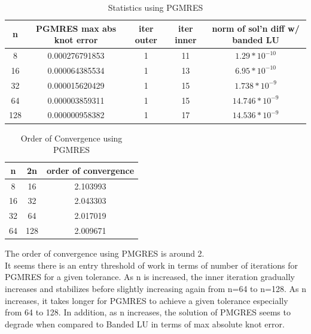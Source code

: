 \documentclass[12pt,letter]{article}
\begin{document}
\begin{enumerate}
\begin{enumerate}
\begin{table}[h]
  \begin{center}
    \begin{tabular}{ | c | c | c | c | c |}
      \hline
      n & PGMRES max abs knot error & iter outer & iter inner & norm of sol'n diff w/ banded LU\\
      \hline
      8 & 0.000276791853 & 1 & 11 & $1.29*10^{-10}$\\
      \hline
      16 & 0.000064385534 & 1 & 13 & $6.95*10^{-10}$\\
      \hline
      32 & 0.000015620429 & 1 & 15 & $1.738*10^{-9}$\\
      \hline
      64 & 0.000003859311 & 1 & 15 & $14.746*10^{-9}$\\
      \hline
      128 & 0.000000958382 & 1 & 17 & $14.536*10^{-9}$\\
      \hline
    \end{tabular}
    \caption{Statistics using PGMRES}
  \end{center}
\end{table}

\begin{table}[h]
  \begin{center}
    \begin{tabular}{ | c | c | c |}
      \hline
      n & 2n & order of convergence\\
      \hline
      8 & 16 & 2.103993\\
      \hline
      16 & 32 & 2.043303\\
      \hline
      32 & 64 & 2.017019\\
      \hline
      64 & 128 & 2.009671\\
      \hline
    \end{tabular}
    \caption{Order of Convergence using PGMRES}
  \end{center}
\end{table}

The order of convergence using PMGRES is around 2.\\

It seems there is an entry threshold of work in terms of number of iterations for PGMRES for a given tolerance. As n is increased, the inner iteration gradually increases and stabilizes before slightly increasing again from n=64 to n=128. As n increases, it takes longer for PGMRES to achieve a given tolerance especially from 64 to 128. In addition, as n increases, the solution of PMGRES seems to degrade when compared to Banded LU in terms of max absolute knot error.\\


\end{enumerate}
\end{enumerate}
\end{document}
